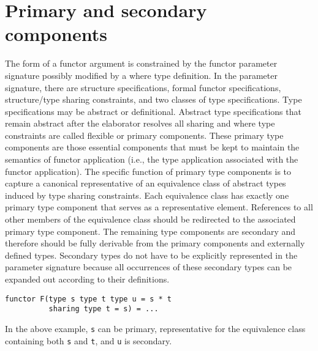 \section{Primary and secondary components}
The form of a functor argument is constrained by the functor parameter signature possibly modified by a where type definition. In the parameter signature, there are structure specifications, formal functor specifications, structure/type sharing constraints, and two classes of type specifications. Type specifications may be abstract or definitional. Abstract type specifications that remain abstract after the elaborator resolves all sharing and where type constraints are called flexible or primary components. These primary type components are those essential components that must be kept to maintain the semantics of functor application (i.e., the type application associated with the functor application). The specific function of primary type components is to capture a canonical representative of an equivalence class of abstract types induced by type sharing constraints. Each equivalence class has exactly one primary type component that serves as a representative element. References to all other members of the equivalence class should be redirected to the associated primary type component. The remaining type components are secondary and therefore should be fully derivable from the primary components and externally defined types. Secondary types do not have to be explicitly represented in the parameter signature because all occurrences of these secondary types can be expanded out according to their definitions. 

\begin{lstlisting}
functor F(type s type t type u = s * t
          sharing type t = s) = ...
\end{lstlisting}

In the above example, \lstinline|s| can be primary, representative for the equivalence class containing both \lstinline|s| and \lstinline|t|, and \lstinline|u| is secondary.